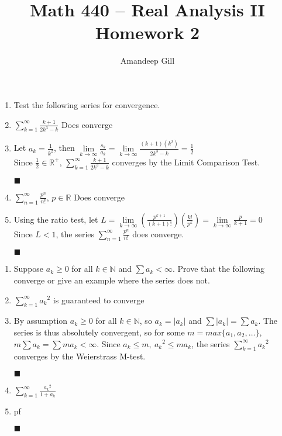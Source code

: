 \documentclass[a4paper,12pt]{report}
\newcommand{\bb}[1]{\mathbb{#1}}
\newcommand{\problem}[3]{
	\begin{enumerate}
		\item[\bf{Problem #1}] #2 
		#3
	\end{enumerate}
}
\newcommand{\subproof}[3]{
	\item[#1] #2
	\item[\bf{Proof:}] 
	#3 
	\begin{flushright}
		$\blacksquare$
	\end{flushright}
}
\begin{document}
\title{Math 440 -- Real Analysis II \\ \vspace{7px} \large{Homework 2}}
\author{Amandeep Gill}
\maketitle

\problem{1}{Test the following series for convergence.}{
	\subproof{(a)}{
		$\sum\limits_{k=1}^{\infty}{\frac{k+1}{2k^3-k}}$ Does converge
	}{
		Let $a_k = \frac{1}{k^2}$, then 
		$\lim\limits_{k \to \infty}{\frac{s_k}{a_k}} = 
		\lim\limits_{k \to \infty}{\frac{(k+1)(k^2)}{2k^3-k}} = \frac{1}{2}$ \\
		Since $\frac{1}{2} \in \mathbb{R^+}$, $\sum\limits_{k=1}^{\infty}{\frac{k+1}{2k^3-k}}$ converges by the Limit Comparison Test.
	}
	
	\subproof{(b)}{
		$\sum\limits_{n=1}^{\infty}{\frac{p^n}{n!}}$, $p \in \mathbb{R}$ Does converge
	}{
		Using the ratio test, let $L = \lim\limits_{k \to \infty}(\frac{p^{k+1}}{(k+1)!})(\frac{k!}{p^{k}}) = \lim\limits_{k \to \infty} \frac{p}{k + 1} = 0$ \\
		Since $L < 1$, the series $\sum\limits_{n=1}^{\infty}{\frac{p^n}{n!}}$ does converge.
	}
}

\problem{2}{
		Suppose $a_k \geqslant 0$ for all $k \in \bb{N}$ and $\sum a_k < \infty$. Prove that the following converge or give an example where the series does not.
	}{
	\subproof{(a)}{
		$\sum\limits_{k=1}^{\infty}{a_k}^2$ is guaranteed to converge
	}{
		By assumption $a_k \geqslant 0$ for all $k \in \bb{N}$, so $a_k = |a_k|$ and $\sum |a_k| = \sum a_k$. The series is thus absolutely convergent, so for some $m = max\{a_1, a_2, \ldots\}$, $m\sum a_k = \sum m a_k < \infty$. Since $a_k \leqslant m,\ {a_k}^2 \leqslant m a_k$, the series $\sum\limits_{k=1}^{\infty}{a_k}^2$ converges by the Weierstrass M-test.
	}
	
	\subproof{(b)}{
		$\sum\limits_{k=1}^{\infty}\frac{{a_k}^2}{1+a_k}$
	}{
		pf
	}
}
\end{document}
